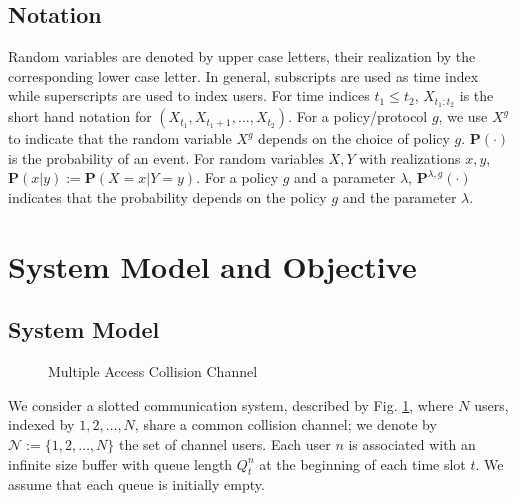 \documentclass[onecolumn,draftcls]{IEEEtran}
\begin{document}
\subsection*{Notation}
Random variables are denoted by upper case letters, their realization by the corresponding lower case letter.
In general, subscripts are used as time index while superscripts are used to index users. 
For time indices $t_1\leq t_2$, $X_{t_1:t_2}$ is the short hand notation for $(X_{t_1},X_{t_1+1},...,X_{t_2})$.
For a policy/protocol $g$, we use $X^{g}$ to indicate that the random variable $X^{g}$ depends on the choice of policy $g$.
$\mathbf{P}(\cdot)$ is the probability of an event. For random variables $X,Y$ with realizations $x,y$, $\mathbf{P}(x|y) := \mathbf{P}(X=x|Y=y)$.
For a policy $g$ and a parameter $\lambda$, $\mathbf{P}^{\lambda,g}(\cdot)$ indicates that the probability depends on the policy $g$ and the parameter $\lambda$.




\section{System Model and Objective}
\label{sec:model}
\subsection{System Model}
\label{sub:model}
\begin{figure}
\begin{center}

\end{center}

\caption{Multiple Access Collision Channel}
\label{fig:system}
\end{figure}
We consider a slotted communication system, described by Fig. \ref{fig:system}, 
where $N$ users, indexed by $1,2,\dots,N$, 
share a common collision channel; we denote by $\mathcal{N}:=\{1,2,\dots,N\}$ the set of channel users.
Each user $n$ is associated with an infinite size buffer
with queue length $Q^n_t$ at the beginning of each time slot $t$.
We assume that each queue is initially empty.
\end{document}
